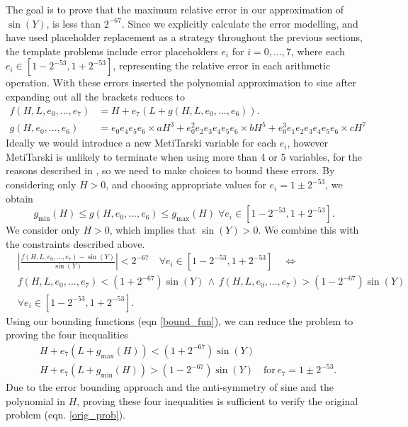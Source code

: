 \documentclass{fac}
\begin{document}
The goal is to prove that the maximum relative error in our approximation of $\sin{(Y)}$, is less than $2^{-67}$. Since we explicitly calculate the error modelling, and have used placeholder replacement as a strategy throughout the previous sections, the template problems include error placeholders $e_i$ for $i=0,...,7$, where each $e_i \in [1-2^{-53},1+2^{-53}]$, representing the relative error in each arithmetic operation. With these errors inserted the polynomial approximation to sine after expanding out all the brackets reduces to
\begin{align*}
    f(H,L, e_0,..., e_7) &= H + e_7(L + g(H,L, e_0,..., e_6)).\\
    g(H, e_0,..., e_6) &= e_0e_4e_5e_6\times aH^3 + e_0^2e_2e_3e_4e_5e_6\times bH^5 + e_0^3e_1e_2e_3e_4e_5e_6\times cH^7
\end{align*}
Ideally we would introduce a new MetiTarski variable for each $e_i$, however MetiTarski is unlikely to terminate when using more than 4 or 5 variables, for the reasons described in \cite{akbarpour2008metitarski}, so we need to make choices to bound these errors. By considering only $H>0$, and choosing appropriate values for $e_i=1\pm 2^{-53}$, we obtain 
\begin{equation} \label{bound_fun}
g_{\textrm{min}}(H) \leq g(H,e_0,...,e_6) \leq g_{\textrm{max}}(H) \; \forall e_i \in [1-2^{-53},1+2^{-53}].
\end{equation}
We consider only $H>0$, which implies that $\sin{(Y)}>0$. We combine this with the constraints described above. 
\begin{align}
    &\left|\frac{f(H,L, e_0,...,e_7)-\sin{(Y)}}{\sin{(Y)}}\right|<2^{-67} \quad \forall e_i \in [1-2^{-53},1+2^{-53}] \label{orig_prob} \quad \Leftrightarrow \\
    & f(H,L,e_0,...,e_7) < (1+2^{-67}) \sin{(Y)} \, \land \, f(H,L,e_0,...,e_7) > (1-2^{-67}) \sin{(Y)} 
    \\
    & \forall e_i \in [1-2^{-53},1+2^{-53}].
\end{align}
Using our bounding functions (eqn \ref{bound_fun}), we can reduce the problem to proving the four inequalities
\begin{align}
    &H + e_7(L+g_{\textrm{max}}(H)) < (1+2^{-67}) \sin{(Y)}\label{upper_bound} \\
    &H + e_7(L+g_{\textrm{min}}(H)) > (1-2^{-67}) \sin{(Y)}\label{lower_bound} \quad \textrm{for}\,  e_7=1\pm2^{-53}.
\end{align}
Due to the error bounding approach and the anti-symmetry of sine and the polynomial in $H$, proving these four inequalities is sufficient to verify the original problem (eqn. \ref{orig_prob}).
\end{document}
